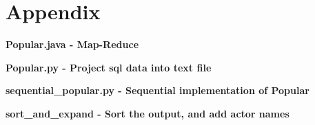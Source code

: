 \documentclass[a4paper,11pt]{article}
\begin{document}




\section{Appendix}
\textbf{Popular.java - Map-Reduce}

\textbf{Popular.py - Project sql data into text file}

\textbf{sequential\_popular.py - Sequential implementation of Popular}

\textbf{sort\_and\_expand - Sort the output, and add actor names}

\end{document}
